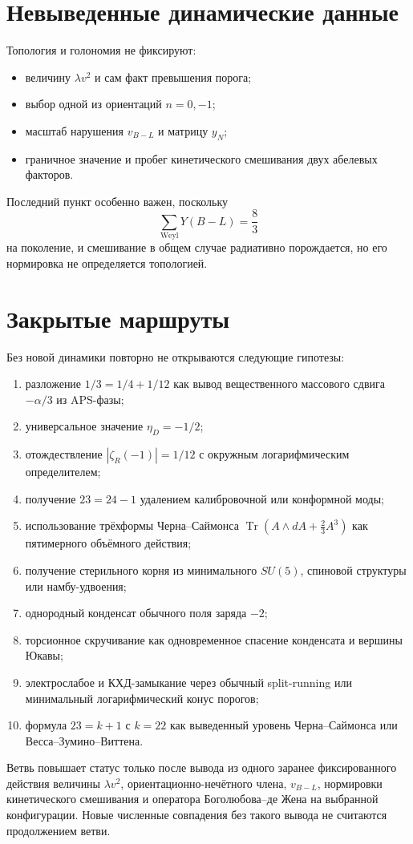 \section{Невыведенные динамические данные}

Топология и голономия не фиксируют:
\begin{itemize}
 \item величину \(\lambda v^2\) и сам факт превышения порога;
 \item выбор одной из ориентаций \(n=0,-1\);
 \item масштаб нарушения \(v_{B-L}\) и матрицу \(y_N\);
 \item граничное значение и пробег кинетического смешивания двух
 абелевых факторов.
\end{itemize}
Последний пункт особенно важен, поскольку
\begin{equation}
 \sum_{\mathrm{Weyl}}Y(B-L)=\frac83
\end{equation}
на поколение, и смешивание в общем случае радиативно порождается, но его
нормировка не определяется топологией.

\section{Закрытые маршруты}

Без новой динамики повторно не открываются следующие гипотезы:
\begin{enumerate}
 \item разложение \(1/3=1/4+1/12\) как вывод вещественного массового
 сдвига \(-\alpha/3\) из APS-фазы;
 \item универсальное значение \(\eta_D=-1/2\);
 \item отождествление \(|\zeta_R(-1)|=1/12\) с окружным
 логарифмическим определителем;
 \item получение \(23=24-1\) удалением калибровочной или конформной моды;
 \item использование трёхформы Черна--Саймонса
 \(\operatorname{Tr}(A\wedge dA+\tfrac23A^3)\) как пятимерного объёмного
 действия;
 \item получение стерильного корня из минимального \(SU(5)\), спиновой
 структуры или намбу-удвоения;
 \item однородный конденсат обычного поля заряда \(-2\);
 \item торсионное скручивание как одновременное спасение конденсата и
 вершины Юкавы;
 \item электрослабое и КХД-замыкание через обычный split-running или
 минимальный логарифмический конус порогов;
 \item формула \(23=k+1\) с \(k=22\) как выведенный уровень
 Черна--Саймонса или Весса--Зумино--Виттена.
\end{enumerate}

\begin{protocol}
Ветвь повышает статус только после вывода из одного заранее фиксированного
действия величины \(\lambda v^2\), ориентационно-нечётного члена,
\(v_{B-L}\), нормировки кинетического смешивания и оператора
Боголюбова--де Жена на выбранной конфигурации. Новые численные совпадения
без такого вывода не считаются продолжением ветви.
\end{protocol}